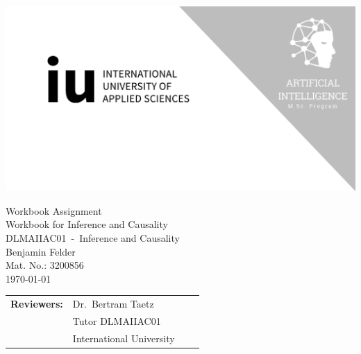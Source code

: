 
\def\Mytitle{Workbook for Inference and Causality}
\def\Mysubtitle{Workbook Assignment}
\def\Mycourse{DLMAIIAC01\ -\ Inference and Causality}
\def\Myauthor{Benjamin Felder}
\def\MyMatricNum{3200856}
\def\Mydate{\germandatetime\today}


\def\RNameA{Dr.\ Bertram Taetz}
\def\RFunctionA{Tutor DLMAIIAC01}
\def\RInstitutionA{International University}

\def\RNameB{}
\def\RFunctionB{}
\def\RInstitutionB{}

\def\RNameC{}
\def\RFunctionC{}
\def\RInstitutionC{}

\thispagestyle{empty}

\centerline{\includegraphics[width=\paperwidth]{template/img/cover-image.png}}

\vspace{8.5em}

{\Large \Mysubtitle}\\
{\Huge \Mytitle}\\
{\LARGE \Mycourse}\\
{\LARGE \Myauthor}\\
{\Large Mat. No.: \MyMatricNum}\\
{\Large \Mydate}

\vspace*{\fill}

\begin{tabular}{p{0.8in} p{1.5in} p{1.5in} p{1.5in}}
    \textbf{Reviewers:} & \RNameA{}        & \RNameB{}        & \RNameC{}        \\
                        & \RFunctionA{}    & \RFunctionB{}    & \RFunctionC{}    \\
                        & \RInstitutionA{} & \RInstitutionB{} & \RInstitutionC{}
\end{tabular}


\restoregeometry{}
\clearpage
